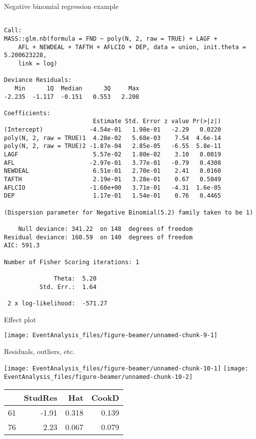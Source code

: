\documentclass[10pt,ignorenonframetext,]{beamer}
\begin{document}
\begin{frame}[fragile]{Negative binomial regression example}

\tiny

\begin{verbatim}

Call:
MASS::glm.nb(formula = FND ~ poly(N, 2, raw = TRUE) + LAGF + 
    AFL + NEWDEAL + TAFTH + AFLCIO + DEP, data = union, init.theta = 5.200623228, 
    link = log)

Deviance Residuals: 
   Min      1Q  Median      3Q     Max  
-2.235  -1.117  -0.151   0.553   2.208  

Coefficients:
                         Estimate Std. Error z value Pr(>|z|)
(Intercept)             -4.54e-01   1.98e-01   -2.29   0.0220
poly(N, 2, raw = TRUE)1  4.28e-02   5.68e-03    7.54  4.6e-14
poly(N, 2, raw = TRUE)2 -1.87e-04   2.85e-05   -6.55  5.8e-11
LAGF                     5.57e-02   1.80e-02    3.10   0.0019
AFL                     -2.97e-01   3.77e-01   -0.79   0.4308
NEWDEAL                  6.51e-01   2.70e-01    2.41   0.0160
TAFTH                    2.19e-01   3.28e-01    0.67   0.5049
AFLCIO                  -1.60e+00   3.71e-01   -4.31  1.6e-05
DEP                      1.17e-01   1.54e-01    0.76   0.4465

(Dispersion parameter for Negative Binomial(5.2) family taken to be 1)

    Null deviance: 341.22  on 148  degrees of freedom
Residual deviance: 160.59  on 140  degrees of freedom
AIC: 591.3

Number of Fisher Scoring iterations: 1

              Theta:  5.20 
          Std. Err.:  1.64 

 2 x log-likelihood:  -571.27 
\end{verbatim}

\end{frame}

\begin{frame}{Effect plot}

\begin{center}\texttt{[image: EventAnalysis\_files/figure-beamer/unnamed-chunk-9-1]} \end{center}

\end{frame}

\begin{frame}{Residuals, outliers, etc.}

\texttt{[image: EventAnalysis\_files/figure-beamer/unnamed-chunk-10-1]}
\texttt{[image: EventAnalysis\_files/figure-beamer/unnamed-chunk-10-2]}

\begin{longtable}[]{@{}lrrr@{}}
\toprule
& StudRes & Hat & CookD\tabularnewline
\midrule
\endhead
61 & -1.91 & 0.318 & 0.139\tabularnewline
76 & 2.23 & 0.067 & 0.079\tabularnewline
\bottomrule
\end{longtable}

\end{frame}
\end{document}
